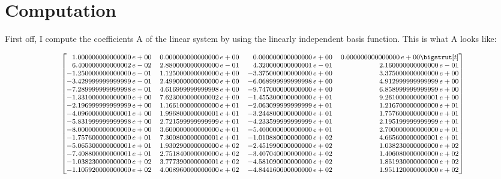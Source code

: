 \documentclass{article}
\begin{document}
\section{Computation}
First off, I compute the coefficients A of the linear system by using the linearly independent basis function. This is what A looks like:
\begin{adjustwidth}{-2em}{-2em}
    \[ \medmath{\begin{bmatrix*}[r]
1.000000000000000\,e+00 & 0.000000000000000\,e+00 & 0.000000000000000\,e+00 & 0.000000000000000\,e+00 \bigstrut[t]\\
6.400000000000002\,e-02 & 2.880000000000000\,e-01 & 4.320000000000001\,e-01 & 2.160000000000000\,e-01 \\
-1.250000000000000\,e-01 & 1.125000000000000\,e+00 & -3.375000000000000\,e+00 & 3.375000000000000\,e+00 \\
-3.429999999999999\,e-01 & 2.499000000000000\,e+00 & -6.068999999999998\,e+00 & 4.912999999999999\,e+00 \\
-7.289999999999998\,e-01 & 4.616999999999998\,e+00 & -9.747000000000000\,e+00 & 6.858999999999999\,e+00 \\
-1.331000000000000\,e+00 & 7.623000000000002\,e+00 & -1.455300000000000\,e+01 & 9.261000000000001\,e+00 \\
-2.196999999999999\,e+00 & 1.166100000000000\,e+01 & -2.063099999999999\,e+01 & 1.216700000000000\,e+01 \\
-4.096000000000001\,e+00 & 1.996800000000001\,e+01 & -3.244800000000000\,e+01 & 1.757600000000000\,e+01 \\
-5.831999999999998\,e+00 & 2.721599999999999\,e+01 & -4.233599999999999\,e+01 & 2.195199999999999\,e+01 \\
-8.000000000000000\,e+00 & 3.600000000000000\,e+01 & -5.400000000000000\,e+01 & 2.700000000000000\,e+01 \\
-1.757600000000000\,e+01 & 7.300800000000001\,e+01 & -1.010880000000000\,e+02 & 4.665600000000001\,e+01 \\
-5.065300000000001\,e+01 & 1.930290000000000\,e+02 & -2.451990000000000\,e+02 & 1.038230000000000\,e+02 \\
-7.408800000000001\,e+01 & 2.751840000000000\,e+02 & -3.407040000000000\,e+02 & 1.406080000000000\,e+02 \\
-1.038230000000000\,e+02 & 3.777390000000001\,e+02 & -4.581090000000000\,e+02 & 1.851930000000000\,e+02 \\
-1.105920000000000\,e+02 & 4.008960000000000\,e+02 & -4.844160000000000\,e+02 & 1.951120000000000\,e+02 \\

\end{bmatrix*}}\]
\end{adjustwidth}
\end{document}
